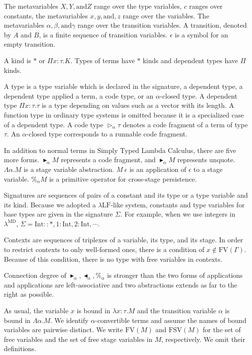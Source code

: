 \documentclass[runningheads]{llncs}
\newcommand{\LMD}{$\lambda^{\textrm{MD}}$\xspace}
\newcommand{\LLF}{$\lambda\textrm{LF}$\xspace}
\newcommand{\G}{\Gamma}
\newcommand{\TW}{\triangleright}
\newcommand{\TB}{\blacktriangleright}
\newcommand{\TBL}{\blacktriangleleft}
\newcommand{\FV}{\text{FV}}
\newcommand{\FTV}{\text{FSV}}
\newcommand{\I}{\textrm{Int}}
\begin{document}
The metavariables $X, Y, \text{and} Z$ range over the type variables, $c$ ranges over constants, the metavariables $x, y, \text{and}, z$ range over the variables.
The metavariables $\alpha, \beta, \text{and} \gamma$ range over the transition variables.
A transition, denoted by $A$ and $B$, is a finite sequence of transition variables.
$\epsilon$ is a symbol for an empty transition.

A kind is $*$ or $\Pi x:\tau.K$. Types of terms have $*$ kinds and dependent types have $\Pi$ kinds.

A type is a type variable which is declared in the signature, a dependent type, a dependent type applied a term, a code type, or an $\alpha$-closed type.
A dependent type $\Pi x:\tau.\tau$ is a type depending on values such as a vector with its length.
A function type in ordinary type systems is omitted because it is a specialized case of a dependent type.
A code type $\TW_\alpha \tau$ denotes a code fragment of a term of type $\tau$.
An $\alpha$-closed type corresponds to a runnable code fragment.

In addition to normal terms in Simply Typed Lambda Calculus, there are five more forms.
$\TB_\alpha M$ represents a code fragment, and $\TB_\alpha M$ represents unquote.
$\Lambda\alpha.M$ is a stage variable abstraction.
$M\ \epsilon$ is an application of $\epsilon$ to a stage variable.
$\%_\alpha M$ is a primitive operator for cross-stage persistence.

Signatures are sequences of pairs of a constant and its type or a type variable and its kind.
Because we adopted a \LLF-like system, constants and type variables for base types are given in the signature $\Sigma$.
For example, when we use integers in \LMD, $\Sigma = \I :: *, 1:\I, 2:\I, \cdots$.

Contexts are sequences of triplexes of a variable, its type, and its stage.
In order to restrict contexts to only well-formed ones, there is a condition of $x\notin\FV(\G)$.
Because of this condition, there is no type with free variables in contexts.

Connection degree of $\TB_\alpha, \TBL_\alpha, \%_\alpha$ is stronger than the two forms of applications
and applications are left-associative
and two abstractions extends as far to the right as possible.

As usual, the variable $x$ is bound in $\lambda x:\tau.M$
and the transition variable $\alpha$ is bound in $\Lambda \alpha.M$.
We identify $\alpha$-convertible terms and assume the names of bound variables are pairwise distinct.
We write $\FV(M)$ and $\FTV(M)$ for the set of free variables and the set of free stage variables in $M$, respectively.
We omit their definitions.
\end{document}
